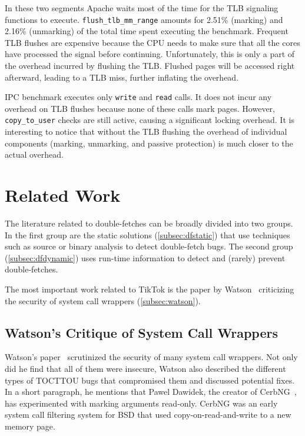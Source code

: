 \documentclass[conference]{IEEEtran}
\newcommand{\sysname}{TikTok}
\begin{document}
In these two segments Apache waits most of the time for the TLB
signaling functions to execute. \texttt{flush\_tlb\_mm\_range} amounts for
2.51\% (marking) and 2.16\% (unmarking) of the total time spent executing the
benchmark. Frequent TLB flushes are expensive because the CPU needs to make sure
that all the cores have processed the signal before continuing. Unfortunately,
this is only a part of the overhead incurred by flushing the TLB. Flushed pages
will be accessed right afterward, leading to a TLB miss, further inflating the
overhead.

IPC benchmark executes only \texttt{write} and \texttt{read} calls. It does not
incur any overhead on TLB flushes because none of these calls mark pages.
However, \texttt{copy\_to\_user} checks are still active, causing a significant
locking overhead. It is interesting to notice that without the TLB flushing the
overhead of individual components (marking, unmarking, and passive protection)
is much closer to the actual overhead.


\section{Related Work}
\label{sec:relatedwork}

The literature related to double-fetches can be broadly divided into two groups.
In the first group are the static solutions (\autoref{subsec:dfstatic}) that use
techniques such as source or binary analysis to detect double-fetch bugs. The
second group (\autoref{subsec:dfdynamic}) uses run-time information to detect
and (rarely) prevent double-fetches.

The most important work related to \sysname{} is the paper by
Watson~\cite{watson2007exploiting} criticizing the security of system call
wrappers (\autoref{subsec:watson}).

\subsection{Watson's Critique of System Call Wrappers}
\label{subsec:watson}
Watson's paper~\cite{watson2007exploiting} scrutinized the security of many
system call wrappers. Not only did he find that all of them were insecure,
Watson also described the different types of TOCTTOU bugs that compromised them
and discussed potential fixes. In a short paragraph, he mentions that Pawel
Dawidek, the creator of CerbNG~\cite{zak_frasunek_dawidek}, has experimented
with marking arguments read-only. CerbNG was an early system call filtering
system for BSD that used copy-on-read-and-write to a new memory page.
\end{document}
